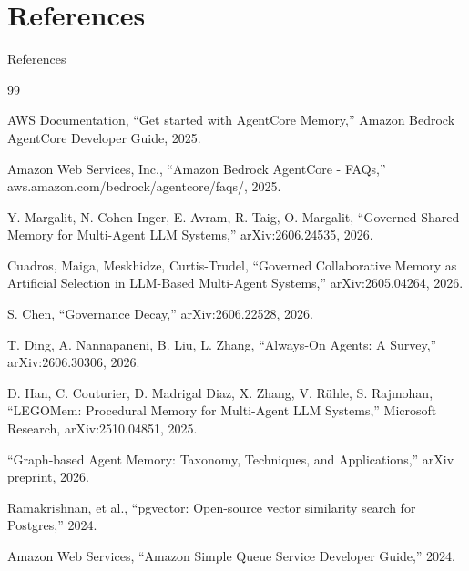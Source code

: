 \documentclass{beamer}
\begin{document}
\section{References}
\begin{frame}{References}

\begin{thebibliography}{99}
\footnotesize

 AWS Documentation, ``Get started with AgentCore Memory,'' Amazon Bedrock AgentCore Developer Guide, 2025.

 Amazon Web Services, Inc., ``Amazon Bedrock AgentCore - FAQs,'' aws.amazon.com/bedrock/agentcore/faqs/, 2025.

 Y. Margalit, N. Cohen-Inger, E. Avram, R. Taig, O. Margalit, ``Governed Shared Memory for Multi-Agent LLM Systems,'' arXiv:2606.24535, 2026.

 Cuadros, Maiga, Meskhidze, Curtis-Trudel, ``Governed Collaborative Memory as Artificial Selection in LLM-Based Multi-Agent Systems,'' arXiv:2605.04264, 2026.

 S. Chen, ``Governance Decay,'' arXiv:2606.22528, 2026.

 T. Ding, A. Nannapaneni, B. Liu, L. Zhang, ``Always-On Agents: A Survey,'' arXiv:2606.30306, 2026.

 D. Han, C. Couturier, D. Madrigal Diaz, X. Zhang, V. R\"uhle, S. Rajmohan, ``LEGOMem: Procedural Memory for Multi-Agent LLM Systems,'' Microsoft Research, arXiv:2510.04851, 2025.

 ``Graph-based Agent Memory: Taxonomy, Techniques, and Applications,'' arXiv preprint, 2026.

 Ramakrishnan, et al., ``pgvector: Open-source vector similarity search for Postgres,'' 2024.

 Amazon Web Services, ``Amazon Simple Queue Service Developer Guide,'' 2024.

\end{thebibliography}

\end{frame}
\end{document}
